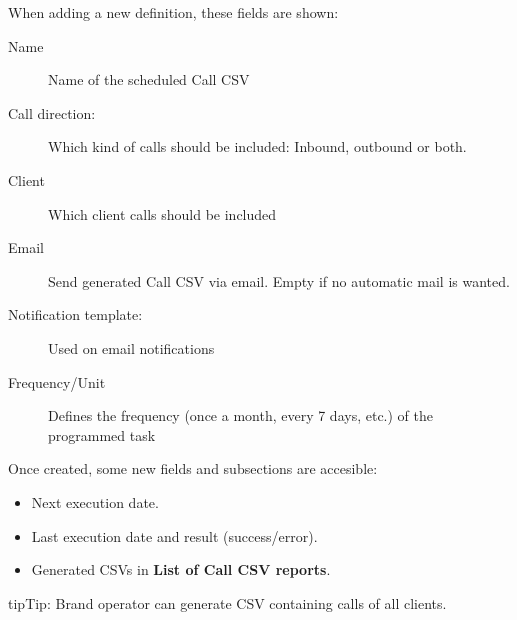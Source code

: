 \documentclass[letterpaper,10pt,english]{sphinxmanual}
\begin{document}
When adding a new definition, these fields are shown:
\begin{description}
\item[{Name}] \leavevmode{}\label{administration_portal/brand/calls/call_csv_schedulers:term-name}
Name of the scheduled Call CSV

\item[{Call direction:}] \leavevmode{}\label{administration_portal/brand/calls/call_csv_schedulers:term-call-direction}
Which kind of calls should be included: Inbound, outbound or both.

\item[{Client}] \leavevmode{}\label{administration_portal/brand/calls/call_csv_schedulers:term-client}
Which client calls should be included

\item[{Email}] \leavevmode{}\label{administration_portal/brand/calls/call_csv_schedulers:term-email}
Send generated Call CSV via email. Empty if no automatic mail is wanted.

\item[{Notification template:}] \leavevmode{}\label{administration_portal/brand/calls/call_csv_schedulers:term-notification-template}
Used on email notifications

\item[{Frequency/Unit}] \leavevmode{}\label{administration_portal/brand/calls/call_csv_schedulers:term-frequency-unit}
Defines the frequency (once a month, every 7 days, etc.) of the programmed task

\end{description}

Once created, some new fields and subsections are accesible:
\begin{itemize}
\item {} 
Next execution date.

\item {} 
Last execution date and result (success/error).

\item {} 
Generated CSVs in \textbf{List of Call CSV reports}.

\end{itemize}

\begin{notice}{tip}{Tip:}
Brand operator can generate CSV containing calls of all clients.
\end{notice}
\end{document}
